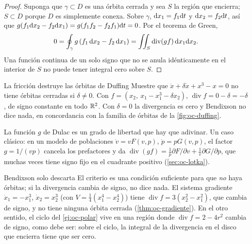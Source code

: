 \begin{proof}
Suponga que $\gamma\subset D$ es una órbita cerrada y sea $S$ la región que encierra; $S\subset D$ porque $D$ es simplemente conexa. Sobre $\gamma$, $\mathrm{d} x_1=f_1\mathrm{d} t$ y $\mathrm{d} x_2=f_2\mathrm{d} t$, así que $g(f_1\mathrm{d} x_2-f_2\mathrm{d} x_1)=g(f_1f_2-f_2f_1)\mathrm{d} t=0$. Por el teorema de Green,
\[
  0=\oint_\gamma g\,(f_1\,\mathrm{d} x_2-f_2\,\mathrm{d} x_1)=\iint_S\operatorname{div}(gf)\,\mathrm{d} x_1\mathrm{d} x_2 .
\]
Una función continua de un solo signo que no se anula idénticamente en el interior de $S$ no puede tener integral cero sobre $S$.
\end{proof}

\begin{ejemplo}[label=ej:oc-duffingfriccion]{La fricción destruye las órbitas de Duffing}
Muestre que $\ddot x+\delta\dot x+x^3-x=0$ no tiene órbitas cerradas si $\delta\neq0$.
\solucion Con $f=(x_2,\ x_1-x_1^3-\delta x_2)$, $\operatorname{div}f=0-\delta=-\delta$, de signo constante en todo $\mathbb{R}^2$. Con $\delta=0$ la divergencia es cero y Bendixson no dice nada, en concordancia con la familia de órbitas de la \cref{fig:oc-duffing}.
\end{ejemplo}


La función $g$ de Dulac es un grado de libertad que hay que adivinar. Un caso clásico: en un modelo de poblaciones $\dot v=vF(v,p)$, $\dot p=pG(v,p)$, el factor $g=1/(vp)$ cancela los prefactores y da $\operatorname{div}(gf)=\frac1p\partial F/\partial v+\frac1v\partial G/\partial p$, que muchas veces tiene signo fijo en el cuadrante positivo (\cref{sec:oc-lotka}).

\begin{trampa}[label=tr:oc-bendixson]{Bendixson solo descarta}
El criterio es una condición suficiente para que \emph{no} haya órbitas; si la divergencia cambia de signo, no dice nada. El sistema gradiente $\dot x_1=-x_1^3$, $\dot x_2=x_2^3$ (con $V=\tfrac14(x_1^4-x_2^4)$) tiene $\operatorname{div}f=3(x_2^2-x_1^2)$, que cambia de signo, y no tiene ninguna órbita cerrada (\cref{thm:oc-gradiente}). En el otro sentido, el ciclo del \cref{ej:oc-polar} vive en una región donde $\operatorname{div}f=2-4r^2$ cambia de signo, como debe ser: sobre el ciclo, la integral de la divergencia en el disco que encierra tiene que ser cero.
\end{trampa}
